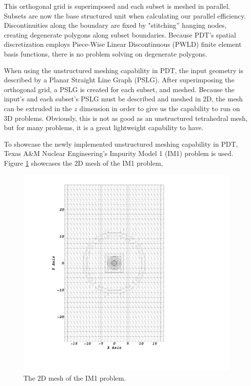\documentclass{anstrans}
\begin{document}
This orthogonal grid is superimposed and each subset is meshed in parallel.  Subsets are now the base structured unit when calculating our parallel efficiency. Discontinuities along the boundary are fixed by "stitching'' hanging nodes, creating degenerate polygons along subset boundaries. Because PDT's spatial discretization employs Piece-Wise Linear Discontinuous (PWLD) finite element basis functions, there is no problem solving on degenerate polygons. 

When using the unstructured meshing capability in PDT, the input geometry is described by a Planar Straight Line Graph (PSLG). After superimposing the orthogonal grid, a PSLG is created for each subset, and meshed. Because the input's and each subset's PSLG must be described and meshed in 2D, the mesh can be extruded in the $z$ dimension in order to give us the capability to run on 3D problems. Obviously, this is not as good as an unstructured tetrahedral mesh, but for many problems, it is a great lightweight capability to have. 

To showcase the newly implemented unstructured meshing capability in PDT, Texas A\&M Nuclear Engineering's Impurity Model 1 (IM1) problem is used. Figure \ref{IM12D} showcases the 2D mesh of the IM1 problem,

\begin{figure}[H]
\centering
\includegraphics[scale = 0.13, trim=28cm  4cm 0cm 4cm,clip]{figures/im12d.png}
\caption{The 2D mesh of the IM1 problem.}
\label{IM12D}
\end{figure}
\end{document}
